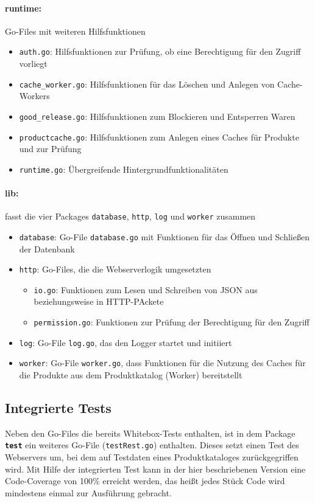\paragraph{runtime:} Go-Files mit weiteren Hilfsfunktionen
	\begin{itemize}	
	\item \texttt{auth.go}: Hilfsfunktionen zur Prüfung, ob eine Berechtigung für den Zugriff vorliegt
	\item \texttt{cache\_worker.go}: Hilfsfunktionen für das Löschen und Anlegen von Cache-Workers
	\item \texttt{good\_release.go}: Hilfsfunktionen zum Blockieren und Entsperren Waren
	\item \texttt{productcache.go}: Hilfsfunktionen zum Anlegen eines Caches für Produkte und zur Prüfung
	\item \texttt{runtime.go}: Übergreifende Hintergrundfunktionalitäten	
	\end{itemize}
	


\newpage
\paragraph{lib:} fasst die vier Packages \texttt{database}, \texttt{http}, \texttt{log} und \texttt{worker} zusammen

	\begin{itemize}
	\item \texttt{database}: Go-File \texttt{database.go} mit Funktionen für das Öffnen und Schließen der Datenbank
	\item \texttt{http}: Go-Files, die die Webserverlogik umgesetzten
		\begin{itemize}
		\item \texttt{io.go}: Funktionen zum Lesen und Schreiben von JSON aus beziehungsweise in HTTP-PAckete
		\item \texttt{permission.go}: Funktionen zur Prüfung der Berechtigung für den Zugriff
		\end{itemize}	
	\item \texttt{log}: Go-File \texttt{log.go}, das den Logger startet und initiiert
	\item \texttt{worker}: Go-File \texttt{worker.go}, dass Funktionen für die Nutzung des Caches für die Produkte aus dem Produktkatalog (Worker) bereitstellt 
	\end{itemize}

\subsection{Integrierte Tests}
\label{subsec: Integrierte Test}
Neben den Go-Files die bereits Whitebox-Tests enthalten, ist in dem Package \textbf{\texttt{test}} ein weiteres Go-File (\texttt{testRest.go}) enthalten. Dieses setzt einen Test des Webservers um, bei dem auf Testdaten eines Produktkataloges zurückgegriffen wird. Mit Hilfe der integrierten Test kann in der hier beschriebenen Version eine Code-Coverage von 100\% erreicht werden, das heißt jedes Stück Code wird mindestens einmal zur Ausführung gebracht.
\newpage

